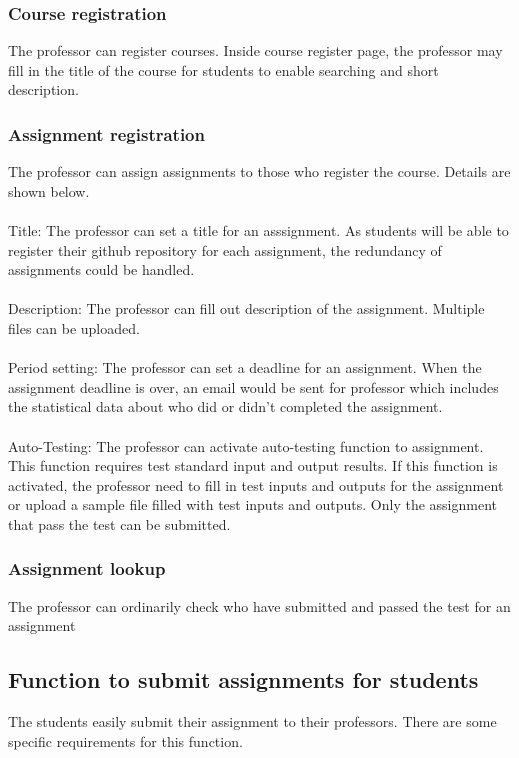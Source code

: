 \documentclass[10pt,journal,compsoc]{IEEEtran}
\begin{document}
\subsubsection{Course registration}
The professor can register courses. Inside course register page, the professor may fill in the title of the course for students to enable searching and short description.

\subsubsection{Assignment registration}
The professor can assign assignments to those who register the course. Details are shown below. \\\\
\null\qquad Title: The professor can set a title for an asssignment. As students will be able to register their github repository for each assignment, the redundancy of assignments could be handled.\\\\
\null\qquad Description: The professor can fill out description of the assignment. Multiple files can be uploaded.\\\\
\null\qquad Period setting: The professor can set a deadline for an assignment. When the assignment deadline is over, an email would be sent for professor which includes the statistical data about who did or didn’t completed the assignment.\\\\
\null\qquad Auto-Testing: The professor can activate auto-testing function to assignment. This function requires test standard input and output results. If this function is activated, the professor need to fill in test inputs and outputs for the assignment or upload a sample file filled with test inputs and outputs. Only the assignment that pass the test can be submitted.
\subsubsection	{Assignment lookup} 
The professor can ordinarily check who have submitted and passed the test for an assignment

\subsection{Function to submit assignments for students}
The students easily submit their assignment to their professors. There are some specific requirements for this function.
\end{document}
